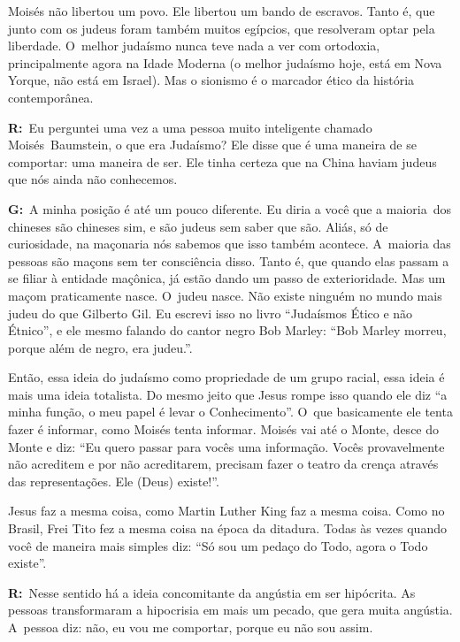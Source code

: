 Moisés não libertou um povo. Ele libertou um bando de escravos. Tanto é,
que junto com os judeus foram também muitos egípcios, que resolveram
optar pela liberdade. O~melhor judaísmo nunca teve nada a ver com
ortodoxia, principalmente agora na Idade Moderna (o melhor judaísmo
hoje, está em Nova Yorque, não está em Israel). Mas o sionismo é o
marcador ético da história contemporânea.

 

\textbf{R:}~Eu perguntei uma vez a uma pessoa muito inteligente chamado
Moisés\textbf{}~Baumstein, o que era Judaísmo? Ele disse que é uma
maneira de se comportar: uma maneira de ser. Ele tinha certeza que na
China haviam judeus que nós ainda não conhecemos.

 

\textbf{G:}~A minha posição é até um pouco diferente. Eu diria a você
que a maioria\textbf{}~dos chineses são chineses sim, e são judeus sem
saber que são. Aliás, só de curiosidade, na maçonaria nós sabemos que
isso também acontece. A~maioria das pessoas são maçons sem ter
consciência disso. Tanto é, que quando elas passam a se filiar à
entidade maçônica, já estão dando um passo de exterioridade. Mas um
maçom praticamente nasce. O~judeu nasce. Não existe ninguém no mundo
mais judeu do que Gilberto Gil. Eu escrevi isso no livro ``Judaísmos
Ético e não Étnico'', e ele mesmo falando do cantor negro Bob Marley:
``Bob Marley morreu, porque além de negro, era judeu.''.

 

Então, essa ideia do judaísmo como propriedade de um grupo racial, essa
ideia é mais uma ideia totalista. Do mesmo jeito que Jesus rompe isso
quando ele diz ``a minha função, o meu papel é levar o Conhecimento''. O~que basicamente ele tenta fazer é informar, como Moisés tenta informar.
Moisés vai até o Monte, desce do Monte e diz: ``Eu quero passar para
vocês uma informação. Vocês provavelmente não acreditem e por não
acreditarem, precisam fazer o teatro da crença através das
representações. Ele (Deus) existe!''.

 

Jesus faz a mesma coisa, como Martin Luther King faz a mesma coisa. Como
no Brasil, Frei Tito fez a mesma coisa na época da ditadura. Todas às
vezes quando você de maneira mais simples diz: ``Só sou um pedaço do
Todo, agora o Todo existe''.

 

\textbf{R:}~Nesse sentido há a ideia concomitante da angústia em ser
hipócrita. As pessoas transformaram a hipocrisia em mais um pecado, que
gera muita angústia. A~pessoa diz: não, eu vou me comportar, porque eu
não sou assim.

